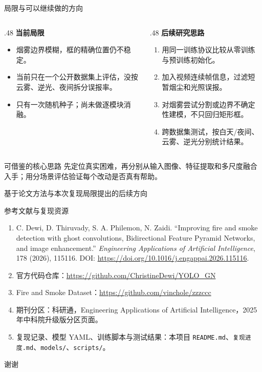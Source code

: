 \documentclass[aspectratio=169,10pt]{ctexbeamer}
\newcommand{\paperref}[1]{\par\vfill{\raggedleft\scriptsize\textcolor{neutral}{#1}\par}}
\begin{document}
\begin{frame}{局限与可以继续做的方向}
  \begin{columns}[T,onlytextwidth]
    \begin{column}{.48\textwidth}
      \textbf{当前局限}\par\medskip
      \begin{itemize}
        \item 烟雾边界模糊，框的精确位置仍不稳定。
        \item 当前只在一个公开数据集上评估，没按云雾、逆光、夜间拆分误报率。
        \item 只有一次随机种子；尚未做逐模块消融。
      \end{itemize}
    \end{column}
    \begin{column}{.48\textwidth}
      \textbf{后续研究思路}\par\medskip
      \begin{enumerate}
        \item 用同一训练协议比较从零训练与预训练初始化。
        \item 加入视频连续帧信息，过滤短暂烟尘和光照误报。
        \item 对烟雾尝试分割或边界不确定性建模，不只回归矩形框。
        \item 跨数据集测试，按白天/夜间、云雾、逆光分别统计结果。
      \end{enumerate}
    \end{column}
  \end{columns}
  \vspace{.2cm}
  \begin{block}{可借鉴的核心思路}
    先定位真实困难，再分别从输入图像、特征提取和多尺度融合入手；用分场景评估验证每个改动是否真有帮助。
  \end{block}
  \paperref{基于论文方法与本次复现局限提出的后续方向}
\end{frame}

\begin{frame}{参考文献与复现资源}
  \small
  \begin{enumerate}
    \item C. Dewi, D. Thiruvady, S. A. Philemon, N. Zaidi. “Improving fire and smoke detection with ghost convolutions, Bidirectional Feature Pyramid Networks, and image enhancement.” \emph{Engineering Applications of Artificial Intelligence}, 178 (2026), 115116. DOI: \url{https://doi.org/10.1016/j.engappai.2026.115116}.
    \item 官方代码仓库：\url{https://github.com/ChristineDewi/YOLO_GN}
    \item Fire and Smoke Dataset：\url{https://github.com/vinchole/zzzccc}
    \item 期刊分区：科研通，Engineering Applications of Artificial Intelligence，2025 年中科院升级版分区页面。
    \item 复现记录、模型 YAML、训练脚本与测试结果：本项目 \texttt{README.md}、\texttt{复现进度.md}、\texttt{models/}、\texttt{scripts/}。
  \end{enumerate}
  \vspace{.35cm}
  \centering\Large 谢谢
\end{frame}
\end{document}
